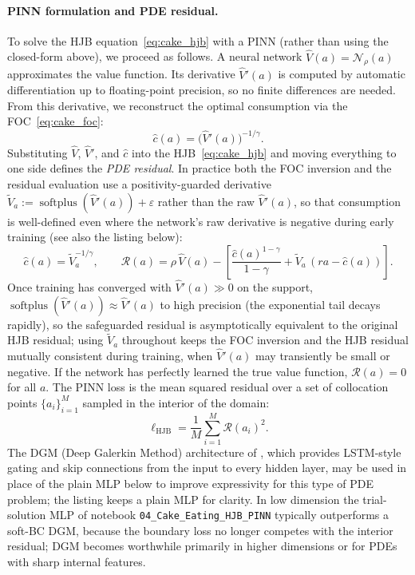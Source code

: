 \documentclass[11pt,a4paper]{report}
\begin{document}
\paragraph{PINN formulation and PDE residual.}
To solve the HJB equation~\eqref{eq:cake_hjb} with a PINN (rather than using the closed-form above), we proceed as follows.  A neural network $\hat{V}(a) = \mathcal{N}_\rho(a)$ approximates the value function.  Its derivative $\hat{V}'(a)$ is computed by automatic differentiation up to floating-point precision, so no finite differences are needed.  From this derivative, we reconstruct the optimal consumption via the FOC~\eqref{eq:cake_foc}:
\begin{equation}
\hat{c}(a) = \bigl(\hat{V}'(a)\bigr)^{-1/\gamma}.
\end{equation}
Substituting $\hat{V}$, $\hat{V}'$, and $\hat{c}$ into the HJB~\eqref{eq:cake_hjb} and moving everything to one side defines the \emph{PDE residual}.  In practice both the FOC inversion and the residual evaluation use a positivity-guarded derivative $\widetilde V_a := \operatorname{softplus}(\hat V'(a)) + \varepsilon$ rather than the raw $\hat V'(a)$, so that consumption is well-defined even where the network's raw derivative is negative during early training (see also the listing below):
\begin{equation}
\hat{c}(a) = \widetilde V_a^{-1/\gamma}, \qquad
\mathcal{R}(a) = \rho\,\hat{V}(a) - \left[\frac{\hat{c}(a)^{1-\gamma}}{1-\gamma} + \widetilde V_a\,(ra - \hat{c}(a))\right].
\label{eq:cake_residual}
\end{equation}
Once training has converged with $\hat V'(a) \gg 0$ on the support, $\operatorname{softplus}(\hat V'(a)) \approx \hat V'(a)$ to high precision (the exponential tail decays rapidly), so the safeguarded residual is asymptotically equivalent to the original HJB residual; using $\widetilde V_a$ throughout keeps the FOC inversion and the HJB residual mutually consistent during training, when $\hat V'(a)$ may transiently be small or negative.
If the network has perfectly learned the true value function, $\mathcal{R}(a) = 0$ for all $a$.  The PINN loss is the mean squared residual over a set of collocation points $\{a_i\}_{i=1}^M$ sampled in the interior of the domain:
\begin{equation}
\ell_{\mathrm{HJB}} = \frac{1}{M}\sum_{i=1}^{M} \mathcal{R}(a_i)^2.
\end{equation}
The DGM (Deep Galerkin Method) architecture of \citet{sirignano2018dgm}, which provides LSTM-style gating and skip connections from the input to every hidden layer, may be used in place of the plain MLP below to improve expressivity for this type of PDE problem; the listing keeps a plain MLP for clarity.  In low dimension the trial-solution MLP of notebook \texttt{04\_Cake\_Eating\_HJB\_PINN} typically outperforms a soft-BC DGM, because the boundary loss no longer competes with the interior residual; DGM becomes worthwhile primarily in higher dimensions or for PDEs with sharp internal features.
\end{document}
